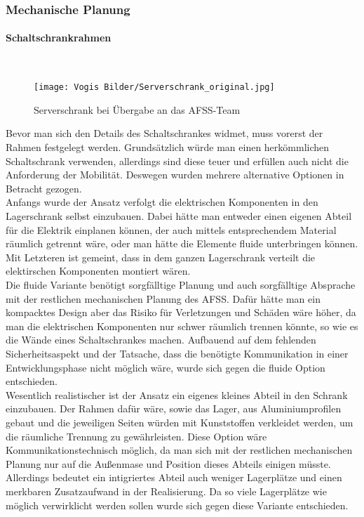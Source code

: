 \subsubsection{Mechanische Planung}

    \paragraph{Schaltschrankrahmen}\mbox{}\\
        \begin{figure}[h]
        \centering
        \texttt{[image: Vogis Bilder/Serverschrank\_original.jpg]}
        \caption{Serverschrank bei Übergabe an das AFSS-Team}
        \label{fig:Serverschrank_original}
    \end{figure}
    Bevor man sich den Details des Schaltschrankes widmet, muss vorerst der Rahmen festgelegt werden. Grundsätzlich würde man einen herkömmlichen Schaltschrank verwenden, allerdings sind diese teuer und erfüllen auch nicht die Anforderung der Mobilität. Deswegen wurden mehrere alternative Optionen in Betracht gezogen.\\
    Anfangs wurde der Ansatz verfolgt die elektrischen Komponenten in den Lagerschrank selbst einzubauen. Dabei hätte man entweder einen eigenen Abteil für die Elektrik einplanen können, der auch mittels entsprechendem Material räumlich getrennt wäre, oder man hätte die Elemente fluide unterbringen können. Mit Letzteren ist gemeint, dass in dem ganzen Lagerschrank verteilt die elektirschen Komponenten montiert wären.\\
    Die fluide Variante benötigt sorgfälltige Planung und auch sorgfälltige Absprache mit der restlichen mechanischen Planung des AFSS. Dafür hätte man ein kompacktes Design aber das Risiko für Verletzungen und Schäden wäre höher, da man die elektrischen Komponenten nur schwer räumlich trennen könnte, so wie es die Wände eines Schaltschrankes machen. Aufbauend auf dem fehlenden Sicherheitsaspekt und der Tatsache, dass die benötigte Kommunikation in einer Entwicklungsphase nicht möglich wäre, wurde sich gegen die fluide Option entschieden.\\
    Wesentlich realistischer ist der Ansatz ein eigenes kleines Abteil in den Schrank einzubauen. Der Rahmen dafür wäre, sowie das Lager, aus Aluminiumprofilen gebaut und die jeweiligen Seiten würden mit Kunststoffen verkleidet werden, um die räumliche Trennung zu gewährleisten. Diese Option wäre Kommunikationstechnisch möglich, da man sich mit der restlichen mechanischen Planung nur auf die Außenmase und Position dieses Abteils einigen müsste. Allerdings bedeutet ein intigriertes Abteil auch weniger Lagerplätze und einen merkbaren Zusatzaufwand in der Realisierung. Da so viele Lagerplätze wie möglich verwirklicht werden sollen wurde sich gegen diese Variante entschieden.\\
